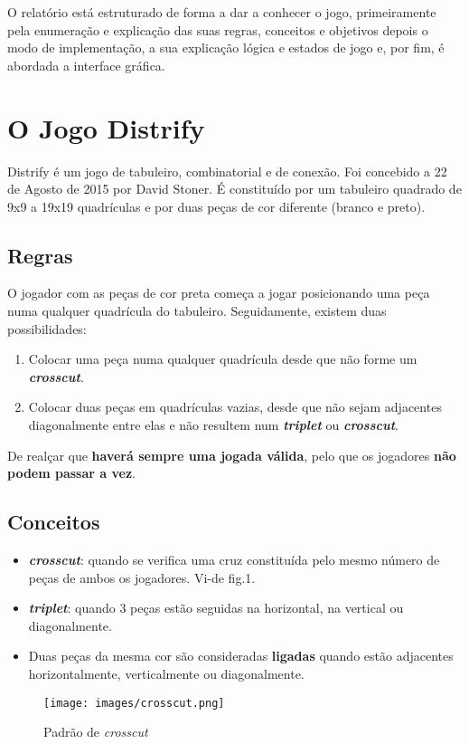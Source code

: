 \documentclass[a4paper]{article}
\begin{document}
O relatório está estruturado de forma a dar a conhecer o jogo, primeiramente pela enumeração e explicação das suas regras, conceitos e objetivos depois o modo de implementação, a sua explicação lógica e estados de jogo e, por fim, é abordada a interface gráfica.

\section{O Jogo Distrify}

Distrify é um jogo de tabuleiro, combinatorial e de conexão. Foi concebido a 22 de Agosto de 2015 por David Stoner.
É constituído por um tabuleiro quadrado de 9x9 a 19x19 quadrículas e por duas peças de cor diferente (branco e preto).
\subsection*{Regras}
O jogador com as peças de cor preta começa a jogar posicionando uma peça numa qualquer quadrícula do tabuleiro. Seguidamente, existem duas possibilidades:
\begin{enumerate}
\item Colocar uma peça numa qualquer quadrícula desde que não forme um \textit{\textbf{crosscut}}.
\item Colocar duas peças em quadrículas vazias, desde que não sejam adjacentes diagonalmente entre elas e não resultem num \textit{\textbf{triplet}} ou \textit{\textbf{crosscut}}.
\end{enumerate}
De realçar que \textbf{haverá sempre uma jogada válida}, pelo que os jogadores \textbf{não podem passar a vez}.

\subsection*{Conceitos}
\begin{itemize}
\item \textit{\textbf{crosscut}}: quando se verifica uma cruz constituída pelo mesmo número de peças de ambos os jogadores. Vi-de fig.1.
\item \textit{\textbf{triplet}}: quando 3 peças estão seguidas na horizontal, na vertical ou diagonalmente.
\item Duas peças da mesma cor são consideradas \textbf{ligadas} quando estão adjacentes horizontalmente, verticalmente ou diagonalmente.
\end{itemize}
\begin{figure}[H]
	\centering
	\texttt{[image: images/crosscut.png]}
	\caption{Padrão de \textit{crosscut}}
	\label{fig:crosscut}
\end{figure}
\end{document}
